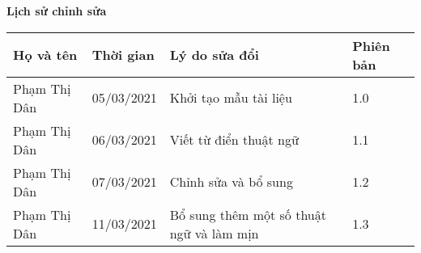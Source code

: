 \documentclass[./main.tex]{subfiles}
\begin{document}
	\begin{center}
		\Large{\textbf{Lịch sử chỉnh sửa}}
		\begin{table}[H]
			\begin{tabular}{|l|l|l|l|}
				\hline
				\textbf{Họ và tên} & \textbf{Thời gian} & \textbf{Lý do sửa đổi}                   & \textbf{Phiên bản} \\ \hline
				Phạm Thị Dân       & 05/03/2021         & Khởi tạo mẫu tài liệu                    & 1.0                \\ \hline
				Phạm Thị Dân       & 06/03/2021         & Viết từ điển thuật ngữ                   & 1.1                \\ \hline
				Phạm Thị Dân       & 07/03/2021         & Chỉnh sửa và bổ sung                     & 1.2                \\ \hline
				Phạm Thị Dân       & 11/03/2021         & Bổ sung thêm một số thuật ngữ và làm mịn & 1.3                \\ \hline
			\end{tabular}
		\end{table}
	\end{center}
	
\end{document}
